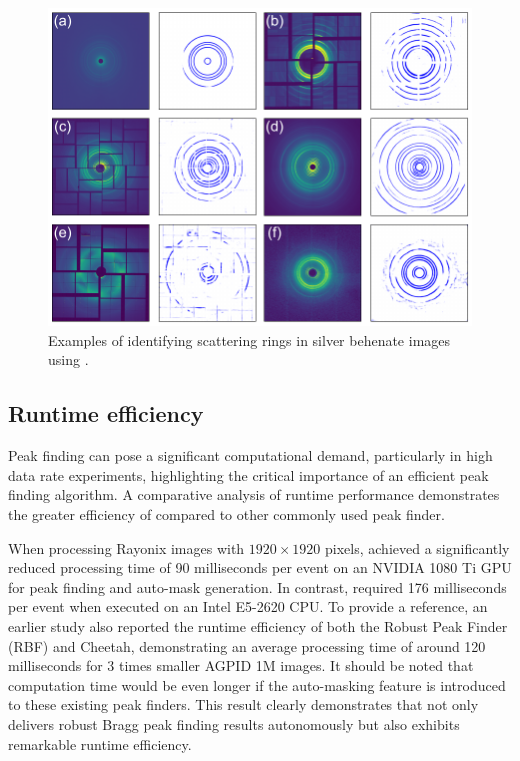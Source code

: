 \documentclass[a4paper]{article}
\begin{document}
\begin{figure}[!ht]
\centering
\includegraphics[width=\textwidth,keepaspectratio]
{./figures/automask.agbehnate.pdf}
\caption{Examples of identifying scattering rings in silver behenate images using
\peaknet{}.}
\label{fig : automask 2}
\end{figure}


\subsection{Runtime efficiency}

Peak finding can pose a significant computational demand, particularly in high data rate experiments, highlighting the critical importance of an efficient peak finding algorithm.  A comparative analysis of runtime performance demonstrates the greater efficiency of \peaknet{} compared to other commonly used \psocake{} peak finder.

When processing Rayonix images with $1920 \times 1920$ pixels, \peaknet{} achieved a significantly reduced processing time of 90 milliseconds per event on an NVIDIA 1080 Ti GPU for peak finding and auto-mask generation.  In contrast, \psocake{} required 176 milliseconds per event when executed on an Intel E5-2620 CPU.  To provide a reference, an earlier study \citep{hadian-jaziDataReductionSerial2021} also reported the runtime efficiency of both the Robust Peak Finder (RBF) and Cheetah, demonstrating an average processing time of around 120 milliseconds for 3 times smaller AGPID 1M images.  It should be noted that computation time would be even longer if the auto-masking feature is introduced to these existing peak finders. This result clearly demonstrates that \peaknet{} not only delivers robust Bragg peak finding results autonomously but also exhibits remarkable runtime efficiency.
\end{document}
